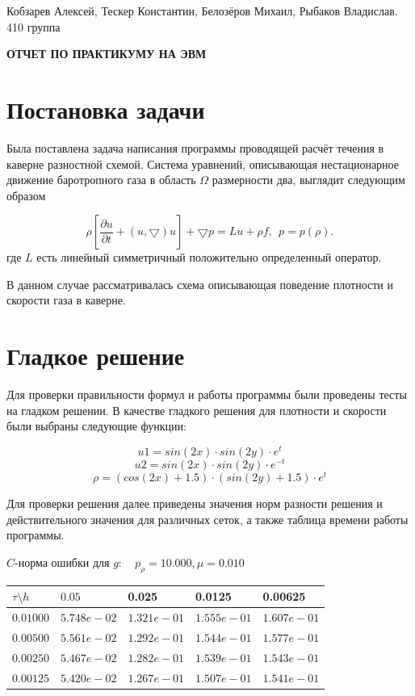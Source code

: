 \documentclass[a4paper, 25pt]{article}
\begin{document}
\begin{flushright}
Кобзарев Алексей, Тескер Константин, Белозёров Михаил, Рыбаков Владислав.
\\
410 группа
\end{flushright}

\begin{center}
\bfseries ОТЧЕТ ПО ПРАКТИКУМУ НА ЭВМ
\end{center}

\section{Постановка задачи}

Была поставлена задача написания программы проводящей расчёт течения в каверне разностной схемой. 
Система уравнений, описывающая нестационарное движение баротропного газа в область $\Omega$ размерности два, выглядит следующим образом

\begin{equation}
 \rho[\frac{\partial u}{\partial t} + (u, \bigtriangledown)u]  + \bigtriangledown p = Lu + \rho f, ~~
 p = p (\rho).
\end{equation}
где $L$ есть линейный симметричный положительно определенный оператор.

В данном случае рассматривалась схема описывающая поведение плотности и скорости газа в каверне.

\section{Гладкое решение}

Для проверки правильности формул и работы программы были проведены тесты на гладком решении. В качестве гладкого решения для плотности и скорости были выбраны следующие функции:

$$u1 = sin (2x) \cdot sin (2y) \cdot e^t$$
$$u2 = sin (2x) \cdot sin (2y) \cdot e^{-t}$$
$$\rho = (cos (2x) + 1.5) \cdot (sin (2y) + 1.5) \cdot e^t$$


Для проверки решения далее приведены значения норм разности решения и действительного значения для различных сеток, а также таблица времени работы программы.

\begin{center}
 $C$-норма ошибки для $g: \quad p_{\rho}=10.000, \mu = 0.010 $
\begin{tabular}{|p{0.6in}|p{0.7in}|p{0.7in}|p{0.7in}|p{0.7in}|} \hline
$\tau\setminus h$ & $0.05$ & 0.025& 0.0125 & 0.00625 \\ \hline
$0.01000$ & $5.748e-02$ &$1.321e-01$ &$1.555e-01$ &$1.607e-01$  \\ \hline
$0.00500$ & $5.561e-02$ &$1.292e-01$ &$1.544e-01$ &$1.577e-01$  \\ \hline
$0.00250$ & $5.467e-02$ &$1.282e-01$ &$1.539e-01$ &$1.543e-01$  \\ \hline
$0.00125$ & $5.420e-02$ &$1.267e-01$ &$1.507e-01$ &$1.541e-01$  \\ \hline
\end{tabular}\\[20pt]
\end{center}
\end{document}
